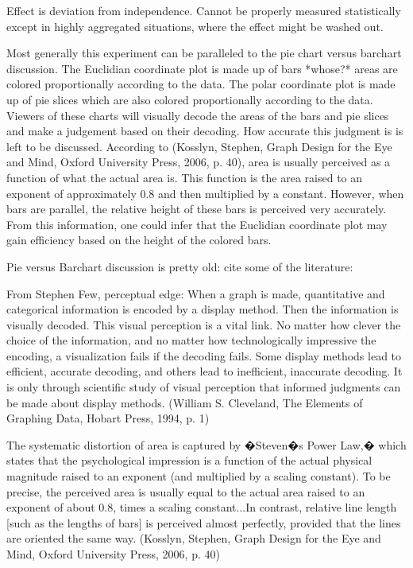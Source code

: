 Effect is deviation from independence. Cannot be properly measured statistically except in highly aggregated situations, where the effect might be washed out.

Most generally this experiment can be paralleled to the pie chart versus barchart discussion. The Euclidian coordinate plot is made up of bars *whose?* areas are colored proportionally according to the data. The polar coordinate plot is made up of pie slices which are also colored proportionally according to the data. Viewers of these charts will visually decode the areas of the bars and pie slices and make a judgement based on their decoding. How accurate this judgment is is left to be discussed. According to (Kosslyn, Stephen, Graph Design for the Eye and Mind, Oxford University Press, 2006, p. 40), area is usually perceived as a function of what the actual area is. This function is the area raised to an exponent of approximately 0.8 and then multiplied by a constant. However, when bars are parallel, the relative height of these bars is perceived very accurately. From this information, one could infer that the Euclidian coordinate plot may gain efficiency based on the height of the colored bars. 


Pie versus Barchart discussion is pretty old: cite some of the literature:

From Stephen Few, perceptual edge:
	When a graph is made, quantitative and categorical information is encoded by a display method. Then the information is visually decoded. This visual perception is a vital link. No matter how clever the choice of the information, and no matter how technologically impressive the encoding, a visualization fails if the decoding fails. Some display methods lead to efficient, accurate decoding, and others lead to inefficient, inaccurate decoding. It is only through scientific study of visual perception that informed judgments can be made about display methods. (William S. Cleveland, The Elements of Graphing Data, Hobart Press, 1994, p. 1)
	
	The systematic distortion of area is captured by �Steven�s Power Law,� which states that the psychological impression is a function of the actual physical magnitude raised to an exponent (and multiplied by a scaling constant). To be precise, the perceived area is usually equal to the actual area raised to an exponent of about 0.8, times a scaling constant...In contrast, relative line length [such as the lengths of bars] is perceived almost perfectly, provided that the lines are oriented the same way. (Kosslyn, Stephen, Graph Design for the Eye and Mind, Oxford University Press, 2006, p. 40)
	
